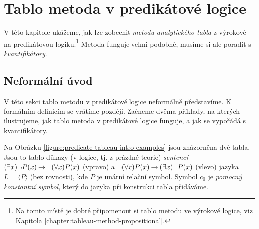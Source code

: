 \chapter{Tablo metoda v predikátové logice}

V této kapitole ukážeme, jak lze zobecnit \emph{metodu analytického tabla} z výrokové na predikátovou logiku.\footnote{Na tomto místě je dobré připomenout si tablo metodu ve výrokové logice, viz Kapitola \ref{chapter:tableau-method-propositional}.} Metoda funguje velmi podobně, musíme si ale poradit s \emph{kvantifikátory}.

\section{Neformální úvod}

V této sekci tablo metodu v predikátové logice neformálně představíme. K formálním definicím se vrátíme později. Začneme dvěma příklady, na kterých ilustrujeme, jak tablo metoda v predikátové logice funguje, a jak se vypořádá s kvantifikátory.

\begin{example} Na Obrázku \ref{figure:predicate-tableau-intro-examples} jsou znázorněna dvě tabla. Jsou to tablo důkazy (v logice, tj. z prázdné teorie) \emph{sentencí} $(\exists x)\neg P(x)\mathbin{\rightarrow}\neg(\forall x)P(x)$ (vpravo) a $\neg(\forall x)P(x)\mathbin{\rightarrow}(\exists x)\neg P(x)$ (vlevo) jazyka $L=\langle P\rangle$ (bez rovnosti), kde $P$ je unární relační symbol. Symbol $c_0$ je \emph{pomocný konstantní symbol}, který do jazyka při konstrukci tabla přidáváme.
\end{example}


